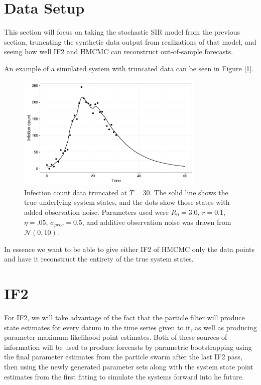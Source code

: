 
\section{Data Setup}

	This section will focus on taking the stochastic SIR model from the previous section, truncating the synthetic data output from realizations of that model, and seeing how well IF2 and HMCMC can reconstruct out-of-sample forecasts.

	An example of a simulated system with truncated data can be seen in Figure [\ref{sc2dataplot}].

	\begin{figure}
        \centering
        \captionsetup{width=.8\linewidth}
        \includegraphics[width=0.8\textwidth]{./images/dataplot.pdf}
        \caption{Infection count data truncated at $T = 30$. The solid line shows the true underlying system states, and the dots show those states with added observation noise. Parameters used were $R_0 = 3.0$, $r = 0.1$, $\eta = .05$, $\sigma_{proc} = 0.5$, and additive observation noise was drawn from $\mathcal{N}(0,10)$. \label{sc2dataplot}}
    \end{figure}

	In essence we want to be able to give either IF2 of HMCMC only the data points and have it reconstruct the entirety of the true system states.
    

\section{IF2}

	For IF2, we will take advantage of the fact that the particle filter will produce state estimates for every datum in the time series given to it, as well as producing parameter maximum likelihood point estimates. Both of these sources of information will be used to produce forecasts by parametric bootstrapping using the final parameter estimates from the particle swarm after the last IF2 pass, then using the newly generated parameter sets along with the system state point estimates from the first fitting to simulate the systems forward into he future.


